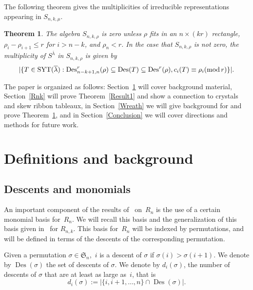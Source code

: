 \documentclass[10pt]{article}
\newcommand{\coloneqq}{:=}
\newcommand{\modrm}{\operatorname{mod}}\newcommand{\Des}{\operatorname{Des}}\newcommand{\des}{\operatorname{des}}
\newtheorem{thm}{Theorem}[section]\newtheorem{lemm}[thm]{Lemma}\newtheorem{prop}[thm]{Proposition}
\begin{document}
The following theorem gives the multiplicities of irreducible representations appearing in $S_{n,k,\mu}$. 

\begin{thm}
\label{Result2}
	The algebra $S_{n,k,\rho}$ is zero unless $\rho$ fits in an $n\times (kr)$ rectangle, $\rho_i-\rho_{i+1}\leq r$ for 
$i>n-k$, and $\rho_n<r$.
	In the case that $S_{n,k,\rho}$ is not zero, the multiplicity of $S^{\overline{\lambda}}$ in $S_{n,k,\rho}$ is given by 
		\begin{equation}
\vert \{T\in \SYT (\overline{\lambda}):
\Des ^r_{n-k+1,n}(\rho)\subseteq \Des (T)\subseteq \Des ^r(\rho), c_i(T)\equiv \rho_i (\modrm r)\}\vert.
\end{equation}
\end{thm}


	The paper is organized as follows: Section~\ref{Def} will cover background material, Section~\ref{Rnk} will prove 
Theorem~\ref{Result1} and show a connection to crystals and skew ribbon tableaux, in Section~\ref{Wreath} we will give 
background for and prove Theorem~\ref{Result2}, and in Section~\ref{Conclusion} we will cover directions and methods 
for future work.

\section{Definitions and background}
\label{Def}

\subsection{Descents and monomials}


	An important component of the results of~\cite{ABR} on~$R_n$ is the use of a certain monomial basis for~$R_n$. We will 
recall this basis and the generalization of this basis given in~\cite{HRS} for $R_{n,k}$. This basis for~$R_n$ will be 
indexed by permutations, and will be defined in terms of the descents of the corresponding permutation.

	Given a permutation $\sigma\in \mathfrak{S}_n$,~$i$ is a descent of $\sigma$ if $\sigma(i)>\sigma(i+1)$. We denote by 
$\Des (\sigma)$ the set of descents of $\sigma$. We denote by $d_i(\sigma)$, the number of descents of $\sigma$ that are at 
least as large as~$i$, that is 
		\begin{equation}
d_i(\sigma)\coloneqq \vert \{i,i+1,\ldots, n\}\cap \Des (\sigma)\vert.
\end{equation}
\end{document}
